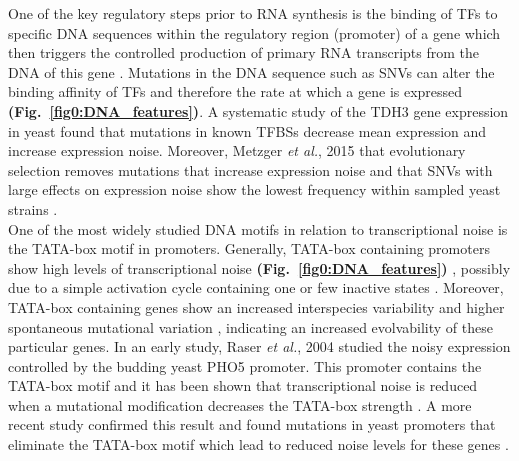 One of the key regulatory steps prior to RNA synthesis is the binding of \glspl{TF} to specific DNA sequences within the regulatory region (promoter) of a gene which then triggers the controlled production of primary RNA transcripts from the DNA of this gene \citep{Latchman1997}. 
Mutations in the DNA sequence such as \glspl{SNV} can alter the binding affinity of TFs and therefore the rate at which a gene is expressed \textbf{(Fig.~\ref{fig0:DNA_features})}. 
A systematic study of the \gls{TDH3} gene expression in yeast found that mutations in known \glspl{TFBS} decrease mean expression and increase expression noise. 
Moreover, Metzger \textit{et al.}, 2015  that evolutionary selection removes mutations that increase expression noise and that SNVs with large effects on expression noise show the lowest frequency within sampled yeast strains \citep{Metzger2015}. 
\\

One of the most widely studied DNA motifs in relation to transcriptional noise is the TATA-box motif in promoters. 
Generally, TATA-box containing promoters show high levels of transcriptional noise \textbf{(Fig.~\ref{fig0:DNA_features})} \citep{Faure2017}, possibly due to a simple activation cycle containing one or few inactive states \citep{Zoller2015}. 
Moreover, TATA-box containing genes show an increased interspecies variability \citep{Tirosh2006} and higher spontaneous mutational variation \citep{Landry2007}, indicating an increased evolvability of these particular genes. 
In an early study, Raser \textit{et al.}, 2004 studied the noisy expression controlled by the budding yeast \gls{PHO5} promoter. 
This promoter contains the TATA-box motif and it has been shown that transcriptional noise is reduced when a mutational modification decreases the TATA-box strength \citep{Raser2004}. 
A more recent study confirmed this result and found mutations in yeast promoters that eliminate the TATA-box motif which lead to reduced noise levels for these genes \citep{Hornung2012}. 
\\

